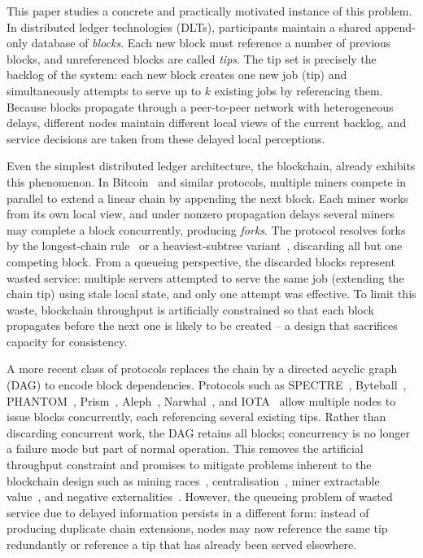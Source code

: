 \documentclass[a4paper,12pt,oneside,reqno]{amsart}
\newcommand{\1}{{\mathbf 1}}
\begin{document}
This paper studies a concrete and practically motivated instance of this problem. In distributed ledger technologies (DLTs), participants maintain a shared append-only database of \emph{blocks}. Each new block must reference a number of previous blocks, and unreferenced blocks are called \emph{tips}. The tip set is precisely the backlog of the system: each new block creates one new job (tip) and simultaneously attempts to serve up to $k$ existing jobs by referencing them. Because blocks propagate through a peer-to-peer network with heterogeneous delays, different nodes maintain different local views of the current backlog, and service decisions are taken from these delayed local perceptions.

Even the simplest distributed ledger architecture, the blockchain, already exhibits this phenomenon. In Bitcoin~\cite{nakamoto2008bitcoin} and similar protocols, multiple miners compete in parallel to extend a linear chain by appending the next block. Each miner works from its own local view, and under nonzero propagation delays several miners may complete a block concurrently, producing \emph{forks}. The protocol resolves forks by the longest-chain rule~\cite{nakamoto2008bitcoin} or a heaviest-subtree variant~\cite{GHOST}, discarding all but one competing block. From a queueing perspective, the discarded blocks represent wasted service: multiple servers attempted to serve the same job (extending the chain tip) using stale local state, and only one attempt was effective. To limit this waste, blockchain throughput is artificially constrained so that each block propagates before the next one is likely to be created -- a design that sacrifices capacity for consistency.

A more recent class of protocols replaces the chain by a directed acyclic graph (DAG) to encode block dependencies. Protocols such as SPECTRE~\cite{spectre}, Byteball~\cite{byteball}, PHANTOM~\cite{phantom}, Prism~\cite{bagaria2019prism}, Aleph~\cite{gkagol2019aleph}, Narwhal~\cite{Narwhal22}, and IOTA~\cite{2020coordicide,OTV} allow multiple nodes to issue blocks concurrently, each referencing several existing tips. Rather than discarding concurrent work, the DAG retains all blocks; concurrency is no longer a failure mode but part of normal operation. This removes the artificial throughput constraint and promises to mitigate problems inherent to the blockchain design such as mining races~\cite{DEVRIES2021105901}, centralisation~\cite{NBERw29396}, miner extractable value~\cite{MEV}, and negative externalities~\cite{Rosenthal22}. However, the queueing problem of wasted service due to delayed information persists in a different form: instead of producing duplicate chain extensions, nodes may now reference the same tip redundantly or reference a tip that has already been served elsewhere.
\end{document}
